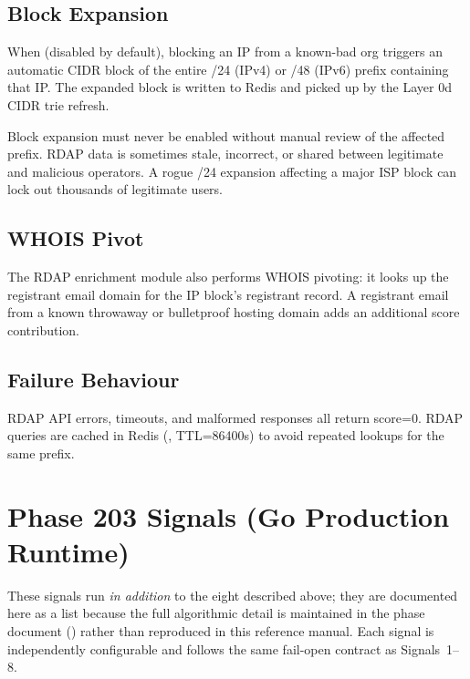 \subsection{Block Expansion}

When  (disabled by default), blocking an IP
from a known-bad org triggers an automatic CIDR block of the entire /24 (IPv4) or
/48 (IPv6) prefix containing that IP. The expanded block is written to Redis and picked
up by the Layer 0d CIDR trie refresh.

\begin{dangerbox}
Block expansion must never be enabled without manual review of the affected prefix.
RDAP data is sometimes stale, incorrect, or shared between legitimate and malicious
operators. A rogue /24 expansion affecting a major ISP block can lock out thousands
of legitimate users.
\end{dangerbox}

\subsection{WHOIS Pivot}

The RDAP enrichment module also performs WHOIS pivoting: it looks up the registrant
email domain for the IP block's registrant record. A registrant email from a known
throwaway or bulletproof hosting domain adds an additional score contribution.

\subsection{Failure Behaviour}

RDAP API errors, timeouts, and malformed responses all return score=0. RDAP queries
are cached in Redis (, TTL=86400s) to avoid repeated
lookups for the same prefix.

\section{Phase 203 Signals (Go Production Runtime)}
\label{sec:phase203-signals}

These signals run \emph{in addition} to the eight described above; they are
documented here as a list because the full algorithmic detail is maintained in the
phase document () rather than reproduced in this
reference manual. Each signal is independently configurable and follows the same
fail-open contract as Signals~1--8.


